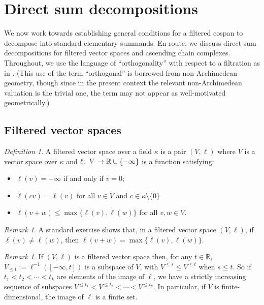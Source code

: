 \documentclass[11pt]{amsart}
\theoremstyle{definition}
\theoremstyle{remark}
\newtheorem{dfn}[theorem]{Definition}
\newtheorem{remark}[theorem]{Remark}
\numberwithin{equation}{section}
\def\co{\colon\thinspace}
\def\R{\mathbb{R}}
\begin{document}
\section{Direct sum decompositions}\label{decompsect}

We now work towards establishing general conditions for a filtered cospan to decompose into standard elementary summands.  En route, we discuss direct sum decompositions for filtered vector spaces and ascending chain complexes.  Throughout, we use the language of ``orthogonality'' with respect to a filtration as in \cite{UZ}.  (This use of the term ``orthogonal'' is borrowed from non-Archimedean geometry, though since in the present context the relevant non-Archimedean valuation is the trivial one, the term may not appear as well-motivated geometrically.)

\subsection{Filtered vector spaces}


\begin{dfn}\label{filtvsdfn}
	A filtered vector space over a field $\kappa$ is a pair $(V,\ell)$ where $V$ is a vector space over $\kappa$ and $\ell\co V\to\R\cup\{-\infty\}$ is a function satisfying: 
	\begin{itemize} \item $\ell(v)=-\infty$ if and only if $v=0$;
		\item $\ell(cv)=\ell(v)$ for all $v\in V$ and $c\in\kappa\setminus\{0\}$ 
		\item $\ell(v+w)\leq\max\{\ell(v),\ell(w)\}$ for all $v,w\in V$.
	\end{itemize} 
\end{dfn}

\begin{remark}\label{strict}
	A standard exercise shows that, in a filtered vector space $(V,\ell)$, if $\ell(v)\neq \ell(w)$, then $\ell(v+w)=\max\{\ell(v),\ell(w)\}$.
\end{remark}

\begin{remark}\label{ellfinite}
	If $(V,\ell)$ is a filtered vector space then, for any $t\in\R$, $V_{\leq t}:=\ell^{-1}([-\infty,t])$ is a subspace of $V$, with $V^{\leq s}\leq V^{\leq t}$ when $s\leq t$.  So if $t_1<t_2<\cdots<t_k$ are elements of the image of $\ell$, we have a strictly increasing sequence of subspaces $V^{\leq t_1}<V^{\leq t_2}<\cdots<V^{\leq t_k}$.  In particular, if $V$ is finite-dimensional, the image of $\ell$ is a finite set.
\end{remark}
\end{document}
